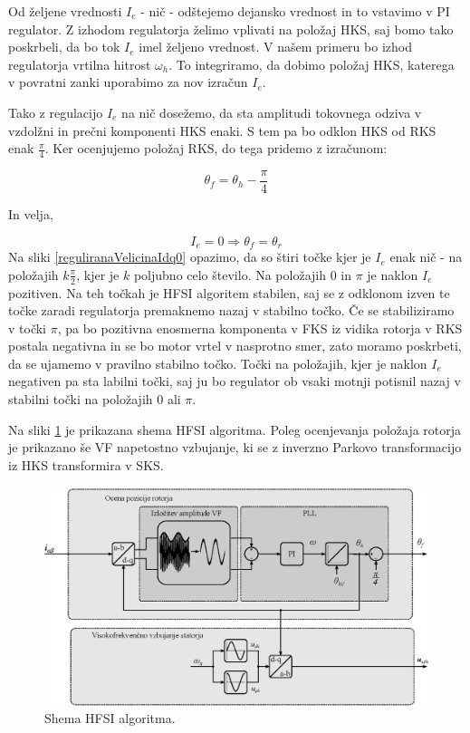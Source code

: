 \documentclass[a4paper,twoside,openright,12pt,slovene]{book}
\begin{document}
Od željene vrednosti $I_e$ - nič - odštejemo dejansko vrednost in to vstavimo v PI regulator. Z izhodom regulatorja želimo vplivati na položaj HKS, saj bomo tako poskrbeli, da bo tok $I_e$ imel
željeno vrednost. V našem primeru bo izhod regulatorja vrtilna hitrost $\omega_h$. To integriramo, da dobimo položaj HKS, katerega v povratni zanki uporabimo za nov izračun $I_e$. 

Tako z regulacijo $I_e$ na nič dosežemo, da sta amplitudi tokovnega odziva v vzdolžni in prečni komponenti HKS enaki. S tem pa bo odklon HKS od RKS enak $\frac{\pi}{4}$. Ker ocenjujemo položaj RKS, do
tega pridemo z izračunom:

\begin{equation}
    \theta_{f} = \theta_{h} - \frac{\pi}{4}
\end{equation}

In velja,

\begin{equation}
    I_e = 0 \Rightarrow \theta_{f} = \theta_{r}
\end{equation}
Na sliki \ref{reguliranaVelicinaIdq0} opazimo, da so štiri točke kjer je $I_e$ enak nič - na položajih $k\frac{\pi}{2}$, kjer je $k$ poljubno celo število. Na položajih 0 in $\pi$ je naklon $I_e$
pozitiven. Na teh točkah je HFSI algoritem stabilen, saj se z odklonom izven te točke zaradi regulatorja premaknemo nazaj v stabilno točko. Če se stabiliziramo v točki $\pi$, pa bo pozitivna enosmerna
komponenta v FKS iz vidika rotorja v RKS postala negativna in se bo motor vrtel v nasprotno smer, zato moramo poskrbeti, da se ujamemo v pravilno stabilno točko. Točki na položajih, kjer je naklon
$I_e$ negativen pa sta labilni točki, saj ju bo regulator ob vsaki motnji potisnil nazaj v stabilni točki na položajih 0 ali $\pi$.

\newpage
Na sliki \ref{HFSIsimple} je prikazana shema HFSI algoritma. Poleg ocenjevanja položaja rotorja je prikazano še VF napetostno vzbujanje, ki se z inverzno Parkovo transformacijo iz HKS transformira v
SKS.

\begin{figure}[!htbp]
    \centering
    \includegraphics[width=0.9\columnwidth]{Slike/Inkscape/HFSIsimple.eps}
    \caption{\label{HFSIsimple} Shema HFSI algoritma.}
\end{figure}
\newpage
\end{document}
